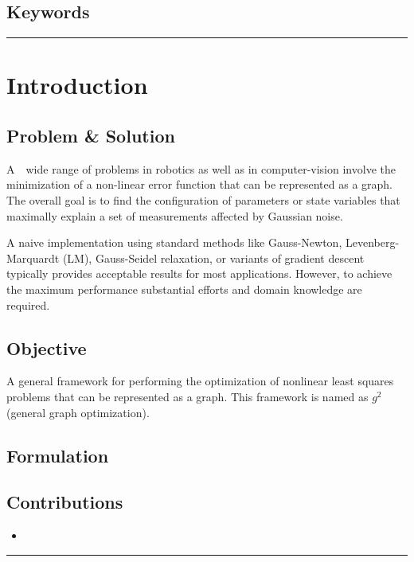 \documentclass[letterpaper,10pt]{article}
\begin{document}
\subsection{Keywords}


\begin{center}\rule{\textwidth}{1pt}\end{center}
\section{Introduction}

\subsection{Problem \& Solution}
A　wide range of problems in robotics as well as in computer-vision involve the minimization of a non-linear error function that can be represented as a graph. The overall goal is to find the configuration of parameters or state variables that maximally explain a set of measurements affected by Gaussian noise.

A naive implementation using standard methods like Gauss-Newton, Levenberg-Marquardt (LM), Gauss-Seidel relaxation, or variants of gradient descent typically provides acceptable results for most applications. However, to achieve the maximum performance substantial efforts and domain  knowledge are required.

\subsection{Objective}
A general framework for performing the optimization of nonlinear least squares problems that can be represented as a graph. This framework is named as $g^2$ (general graph optimization).

\subsection{Formulation}


\subsection{Contributions}
\begin{itemize}
	\item 
\end{itemize}

\begin{center}\rule{\textwidth}{1pt}\end{center}
\end{document}
